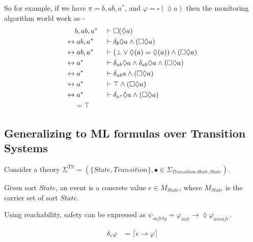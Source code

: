\documentclass[11pt]{article}
\newcommand{\derivative}[2]{\delta_{#1} #2}
\newcommand{\State}{\textit{State}}
\newcommand{\Transition}{\textit{Transition}}
\newcommand{\unsafe}{\textit{unsafe}}
\begin{document}
So for example, if we have $\pi = b , a b , a^*$, and $\varphi = \square (\lozenge a ) $
then the monitoring algorithm world work as -
\begin{align*}
  &\null b, a b , a^*              &\null \vdash \; &\null \square (\lozenge a ) \\
  \leftrightarrow &\null \; a b, a^* &\null \vdash \; &\null \derivative{b}{\lozenge a} \wedge (\square \lozenge a)  \\
  \leftrightarrow &\null \; a b, a^* &\null \vdash \; &\null (\bot \vee
  \lozenge(a) = \lozenge(a))  \wedge (\square \lozenge a)  \\
  \leftrightarrow &\null \;  a^* &\null \vdash \; &\null \derivative{a b }{\lozenge a} \wedge \derivative{a b}{\lozenge a} \wedge  (\square \lozenge a)  \\
  \leftrightarrow &\null \;  a^* &\null \vdash \; &\null \derivative{a b }{a}  \wedge  (\square \lozenge a)  \\
  \leftrightarrow &\null \;  a^* &\null \vdash \; &\null \top  \wedge  (\square \lozenge a)  \\
  \leftrightarrow &\null \; a^* &\null \vdash \; &\null \derivative{a^*}{\lozenge a} \wedge
   (\square \lozenge a) \\
  &\null = \top
\end{align*}

\subsection{Generalizing to ML formulas over Transition Systems}
Consider a theory $\mathbb{\Sigma}^{\text{TS}} =
(\{\State,\Transition\}, \bullet \in \Sigma_{\Transition \, \State, \State})$.

Given sort $\textit{State}$, an event is a concrete value
$e \in M_{\State}$, where $M_{\State}$ is the carrier set of sort $\State$.

Using reachability, safety can be
expressed as
$ \psi_\textit{safety} = \varphi_{\textit{init}} \to \lozenge \varphi_{\unsafe}$.

\begin{align*}
  \derivative{e}{\varphi} &= \lceil e \to \varphi \rceil  \\
\end{align*}
\end{document}
